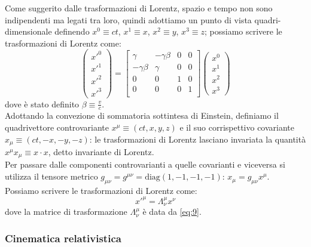Come suggerito dalle trasformazioni di Lorentz, spazio e tempo non sono indipendenti ma legati tra loro, quindi adottiamo un punto di vista quadri-dimensionale definendo $ x^0 \equiv ct $, $ x^1 \equiv x $, $ x^2 \equiv y $, $ x^3 \equiv z $; possiamo scrivere le trasformazioni di Lorentz come:
\begin{equation}
	\begin{pmatrix}
		x'^0 \\ x'^1 \\ x'^2 \\ x'^3
	\end{pmatrix}
	=
	\begin{bmatrix}
		\gamma & -\gamma\beta & 0 & 0 \\ 
		-\gamma\beta & \gamma & 0 & 0 \\ 
		0 & 0 & 1 & 0 \\ 
		0 & 0 & 0 & 1 \\ 
	\end{bmatrix}
	\begin{pmatrix}
		x^0 \\ x^1 \\ x^2 \\ x^3 
	\end{pmatrix}
	\label{eq:9}
\end{equation}
dove è stato definito $ \beta\equiv\frac{v}{c} $. \\ 
%
Adottando la convezione di sommatoria sottintesa di Einstein, definiamo il quadrivettore controvariante $ x^{\mu} \equiv (ct, x, y, z) $ e il suo corrispettivo covariante $ x_{\mu} \equiv (ct, -x, -y, -z) $: le trasformazioni di Lorentz lasciano invariata la quantità $ x^{\mu}x_{\mu} \equiv x\cdot x$, detto invariante di Lorentz. \\ 
%
Per passare dalle componenti controvarianti a quelle covarianti e viceversa si utilizza il tensore metrico $ g_{\mu\nu} = g^{\mu\nu} = \text{diag}(1,-1,-1,-1) $: $ x_{\mu} = g_{\mu\nu}x^{\mu} $. \\ 
Possiamo scrivere le trasformazioni di Lorentz come:
\begin{equation}
	x'^{\mu} = \Lambda^{\mu}_{\nu} x^{\nu}
	\label{eq:10}
\end{equation}
dove la matrice di trasformazione $ \Lambda^{\mu}_{\nu} $ è data da \ref{eq:9}.

\subsubsection{Cinematica relativistica}

